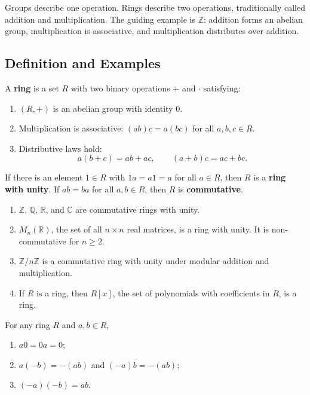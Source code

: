 Groups describe one operation. Rings describe two operations, traditionally called addition and multiplication. The guiding example is $\mathbb{Z}$: addition forms an abelian group, multiplication is associative, and multiplication distributes over addition.

\subsection{Definition and Examples}

\begin{definition}[Ring]
A \textbf{ring} is a set $R$ with two binary operations $+$ and $\cdot$ satisfying:
\begin{enumerate}
    \item $(R,+)$ is an abelian group with identity $0$.
    \item Multiplication is associative: $(ab)c=a(bc)$ for all $a,b,c\in R$.
    \item Distributive laws hold:
    \[
        a(b+c)=ab+ac,
        \qquad
        (a+b)c=ac+bc.
    \]
\end{enumerate}
If there is an element $1\in R$ with $1a=a1=a$ for all $a\in R$, then $R$ is a \textbf{ring with unity}. If $ab=ba$ for all $a,b\in R$, then $R$ is \textbf{commutative}.
\end{definition}

\begin{example}
\begin{enumerate}
    \item $\mathbb{Z}$, $\mathbb{Q}$, $\mathbb{R}$, and $\mathbb{C}$ are commutative rings with unity.
    \item $M_n(\mathbb{R})$, the set of all $n\times n$ real matrices, is a ring with unity. It is non-commutative for $n\geq 2$.
    \item $\mathbb{Z}/n\mathbb{Z}$ is a commutative ring with unity under modular addition and multiplication.
    \item If $R$ is a ring, then $R[x]$, the set of polynomials with coefficients in $R$, is a ring.
\end{enumerate}
\end{example}

\begin{proposition}
For any ring $R$ and $a,b\in R$,
\begin{enumerate}
    \item $a0=0a=0$;
    \item $a(-b)=-(ab)$ and $(-a)b=-(ab)$;
    \item $(-a)(-b)=ab$.
\end{enumerate}
\end{proposition}

